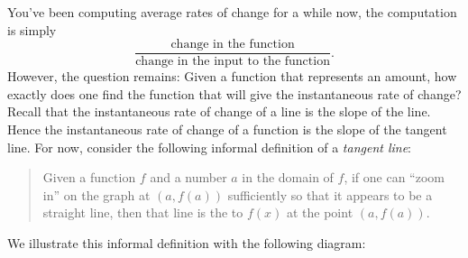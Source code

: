 \documentclass{ximera}
\begin{document}
You've been computing average rates of change for a while now, the
computation is simply
\[
\frac{\text{change in the function}}{\text{change in the input to the
    function}}.
\]
However, the question remains: Given a function that represents an
amount, how exactly does one find the function that will give the
instantaneous rate of change? Recall that the instantaneous rate of change
of a line is the slope of the line.  Hence the instantaneous rate of
change of a function is the slope of the tangent line. For now,
consider the following informal definition of a \textit{tangent line}:
\begin{quote}
Given a function $f$ and a number $a$ in the domain of $f$, if one can ``zoom in''
on the graph at $(a, f(a))$ sufficiently so that it appears to be a straight line,
then that line is the  to $f(x)$ at the point $(a,f(a))$.
\end{quote}
We illustrate this informal definition with the following diagram:
\end{document}
